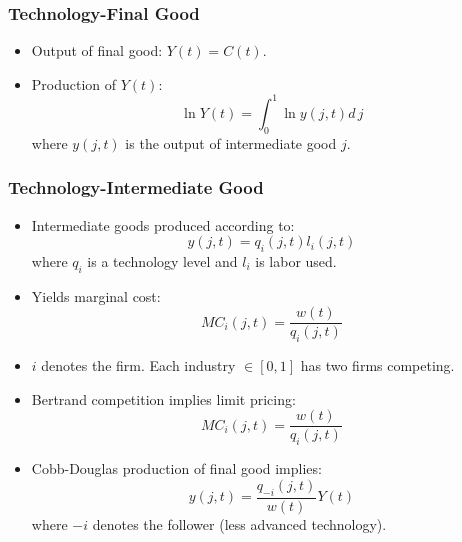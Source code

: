 \documentclass{beamer}
\begin{document}
\begin{frame}[t]\frametitle{Technology-Final Good} 
  \begin{itemize}
    \item Output of final good: $Y(t) = C(t)$.
    
    \item Production of $Y(t)$:
      \begin{equation} \label{eq:tech_output}
        \ln Y(t) = \int_{0}^{1} \ln y(j, t) d\,j 
      \end{equation}
      where $y(j, t)$ is the output of intermediate good $j$.
    
  \end{itemize}
\end{frame}

\begin{frame}[t]\frametitle{Technology-Intermediate Good} 
  \begin{itemize}
    \item Intermediate goods produced according to:
      \begin{equation*} \label{eq:intermediate_production}
        y(j, t) = q_i(j, t)l_i(j, t)
      \end{equation*}
      where $q_i$ is a technology level and $l_i$ is labor used. 

    \item Yields marginal cost:
      \begin{equation*} \label{eq:marginal_cost}
        MC_i(j, t) = \frac{w(t)}{q_i(j, t)}
      \end{equation*}

    \item $i$ denotes the firm.  Each industry $\in [0, 1]$ has two firms competing.

    \item Bertrand competition implies limit pricing:
      \begin{equation*} \label{eq:limit_pricing}
        MC_i(j, t) = \frac{w(t)}{q_i(j, t)}
      \end{equation*}
  
    \item Cobb-Douglas production of final good implies:
      \begin{equation}
        y(j, t) = \frac{q_{-i}(j, t)}{w(t)}Y(t)
      \end{equation}
      where $-i$ denotes the follower (less advanced technology).
  \end{itemize}
\end{frame}
\end{document}
